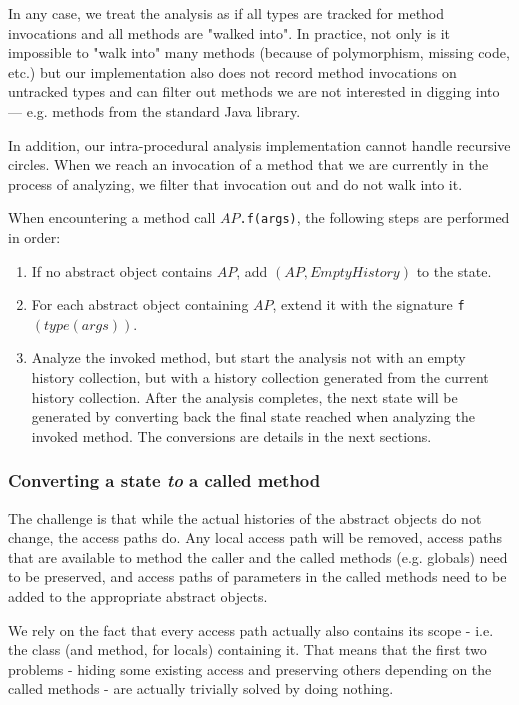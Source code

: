 \documentclass{article}
\begin{document}
In any case, we treat the analysis as if all types are tracked for method invocations and all methods are "walked into". In practice, not only is it impossible to "walk into" many methods (because of polymorphism, missing code, etc.) but our implementation also does not record method invocations on untracked types and can filter out methods we are not interested in digging into --- e.g. methods from the standard Java library.

In addition, our intra-procedural analysis implementation cannot handle recursive circles. When we reach an invocation of a method that we are currently in the process of analyzing, we filter that invocation out and do not walk into it.

When encountering a method call $AP$\texttt{.f(args)}, the following steps are performed in order:

\begin{enumerate}
	\item If no abstract object contains $AP$, add $(AP, EmptyHistory)$ to the state.
	\item For each abstract object containing $AP$, extend it with the signature \texttt{f}$(type(args))$.
	\item Analyze the invoked method, but start the analysis not with an empty history collection, but with a history collection generated from the current history collection. After the analysis completes, the next state will be generated by converting back the final state reached when analyzing the invoked method. The conversions are details in the next sections.
\end{enumerate}

\subsubsection{Converting a state \emph{to} a called method}

The challenge is that while the actual histories of the abstract objects do not change, the access paths do. Any local access path will be removed, access paths that are available to method the caller and the called methods (e.g. globals) need to be preserved, and access paths of parameters in the called methods need to be added to the appropriate abstract objects.

We rely on the fact that every access path actually also contains its scope - i.e. the class (and method, for locals) containing it. That means that the first two problems - hiding some existing access and preserving others depending on the called methods - are actually trivially solved by doing nothing.
\end{document}
